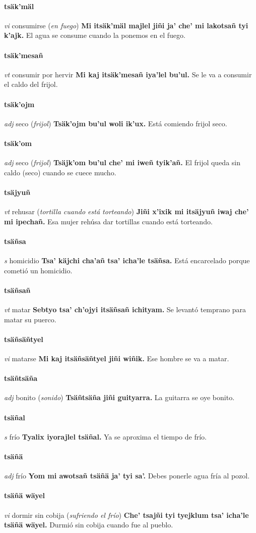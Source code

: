 \documentclass{scrbook}
\newcommand{\entry}[1]{\paragraph{#1}}
\newcommand{\partofspeech}[1]{\textit{#1}}
\newcommand{\spanishtranslation}[1]{#1}
\newcommand{\clarification}[1]{(\textit{#1})}
\newcommand{\cholexample}[1]{\textbf{#1}}
\newcommand{\exampletranslation}[1]{#1}
\begin{document}
\begin{multicols}{2}
\entry{tsäk'mäl}
\partofspeech{vi}
\spanishtranslation{consumirse}
\clarification{en fuego}
\cholexample{Mi itsäk'mäl majlel jiñi ja' che' mi lakotsañ tyi k'ajk.}
\exampletranslation{El agua se consume cuando la ponemos en el fuego.}

\entry{tsäk'mesañ}
\partofspeech{vt}
\spanishtranslation{consumir por hervir}
\cholexample{Mi kaj itsäk'mesañ iya'lel bu'ul.}
\exampletranslation{Se le va a consumir el caldo del frijol.}

\entry{tsäk'ojm}
\partofspeech{adj}
\spanishtranslation{seco}
\clarification{frijol}
\cholexample{Tsäk'ojm bu'ul woli ik'ux.}
\exampletranslation{Está comiendo frijol seco.}

\entry{tsäk'om}
\partofspeech{adj}
\spanishtranslation{seco}
\clarification{frijol}
\cholexample{Tsäjk'om bu'ul che' mi iweñ tyik'añ.}
\exampletranslation{El frijol queda sin caldo (seco) cuando se cuece mucho.}

\entry{tsäjyuñ}
\partofspeech{vt}
\spanishtranslation{rehusar}
\clarification{tortilla cuando está torteando}
\cholexample{Jiñi x'ixik mi itsäjyuñ iwaj che' mi ipechañ.}
\exampletranslation{Esa mujer rehúsa dar tortillas cuando está torteando.}

\entry{tsäñsa}
\partofspeech{s}
\spanishtranslation{homicidio}
\cholexample{Tsa' käjchi cha'añ tsa' icha'le tsäñsa.}
\exampletranslation{Está encarcelado porque cometió un homicidio.}

\entry{tsäñsañ}
\partofspeech{vt}
\spanishtranslation{matar}
\cholexample{Sebtyo tsa' ch'ojyi itsäñsañ ichityam.}
\exampletranslation{Se levantó temprano para matar su puerco.}

\entry{tsäñsäñtyel}
\partofspeech{vi}
\spanishtranslation{matarse}
\cholexample{Mi kaj itsäñsäñtyel jiñi wiñik.}
\exampletranslation{Ese hombre se va a matar.}

\entry{tsäñtsäña}
\partofspeech{adj}
\spanishtranslation{bonito}
\clarification{sonido}
\cholexample{Tsäñtsäña jiñi guityarra.}
\exampletranslation{La guitarra se oye bonito.}

\entry{tsäñal}
\partofspeech{s}
\spanishtranslation{frío}
\cholexample{Tyalix iyorajlel tsäñal.}
\exampletranslation{Ya se aproxima el tiempo de frío.}

\entry{tsäñä}
\partofspeech{adj}
\spanishtranslation{frío}
\cholexample{Yom mi awotsañ tsäñä ja' tyi sa'.}
\exampletranslation{Debes ponerle agua fría al pozol.}

\entry{tsäñä wäyel}
\partofspeech{vi}
\spanishtranslation{dormir sin cobija}
\clarification{sufriendo el frío}
\cholexample{Che' tsajñi tyi tyejklum tsa' icha'le tsäñä wäyel.}
\exampletranslation{Durmió sin cobija cuando fue al pueblo.}


\end{multicols}
\end{document}

